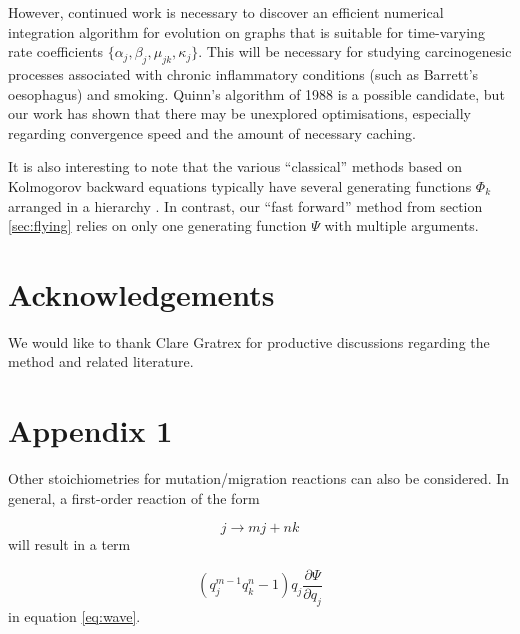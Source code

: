 \documentclass{article}
\begin{document}
However, continued work is necessary to discover an efficient numerical integration algorithm for
evolution on graphs that is suitable for time-varying rate coefficients $\{\alpha_j,
\beta_j, \mu_{jk}, \kappa_j\}$. This will be necessary for studying
carcinogenesic processes associated with chronic inflammatory conditions (such as
Barrett's oesophagus) and smoking. Quinn's algorithm of 1988 is a possible candidate, but our work has
shown that there may be unexplored optimisations, especially regarding
convergence speed and the amount of necessary caching.

It is also interesting to note that the various ``classical'' methods based on
Kolmogorov backward equations typically have several generating functions $\Phi_k$
arranged in a hierarchy \cite{luebeck2013impact,zhang2022waiting,donotcite}. 
In contrast, our ``fast forward'' method from section \ref{sec:flying} relies on only one generating function $\Psi$ with multiple arguments. 

\section{Acknowledgements}

We would like to thank Clare Gratrex for productive discussions regarding the
method and related literature. %






\section{Appendix 1}

Other stoichiometries for mutation/migration reactions can also be considered.
In general, a first-order reaction of the form

\begin{equation}
    j \rightarrow m j + n k
\end{equation}
will result in a term

\begin{equation}
    (q_j^{m-1} q_k^n - 1) q_j \frac{\partial \Psi}{\partial q_j}
\end{equation}
in equation \eqref{eq:wave}.
\end{document}
